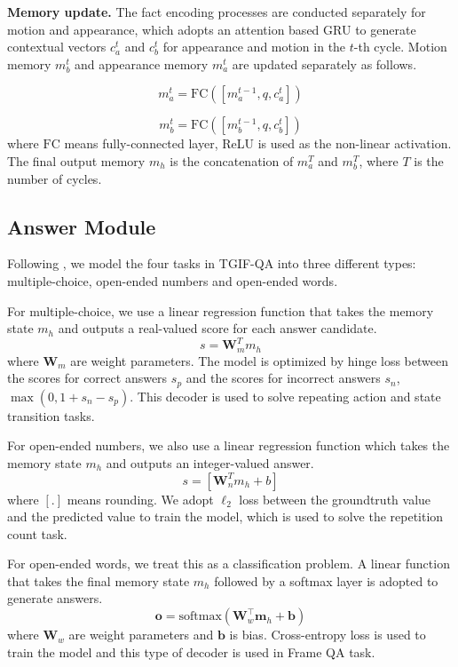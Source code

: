 \documentclass[10pt,twocolumn,letterpaper]{article}
\begin{document}
\textbf{Memory update.} The fact encoding processes are conducted separately for motion and appearance, which adopts an attention based GRU \cite{xiong2016dynamic} to generate contextual vectors $c_a^t$ and $c_b^t$ for appearance and motion in the $t$-th cycle. Motion memory $m_b^t$ and appearance memory $m_a^t$ are updated separately as follows.

\begin{equation}
    m_a^t=\mbox{FC}([m_a^{t-1},q,c_a^t])
\end{equation}

\begin{equation}
    m_b^t=\mbox{FC}([m_b^{t-1},q,c_b^t])
\end{equation}
where $\mbox{FC}$ means fully-connected layer, ReLU is used as the non-linear activation. The final output memory $m_h$ is the concatenation of $m_a^T$ and $m_b^T$, where $T$ is the number of cycles.


\subsection{Answer Module}
Following \cite{Jang_2017_CVPR}, we model the four tasks in TGIF-QA \cite{Jang_2017_CVPR} into three different types: multiple-choice, open-ended numbers and open-ended words. 

For multiple-choice, we use a linear regression function that takes the memory state $m_h$ and outputs a real-valued score for each answer candidate.
\begin{equation}
    s=\mathbf W_m^T m_h
\end{equation}
where $\mathbf W_m$ are weight parameters. The model is optimized by hinge loss between the scores for correct answers $s_p$ and the scores for incorrect answers $s_n$, $\max(0, 1 + s_{n} - s_{p})$. This decoder is used to solve repeating action and state transition tasks.

For open-ended numbers, we also use a linear regression function which takes the memory state $m_h$ and outputs an integer-valued answer.
\begin{equation}
    s=[\mathbf W_n^T m_h+b]
\end{equation}
where $[.]$ means rounding. We adopt $\ell_2$ loss between the groundtruth value and the predicted value to train the model, which is used to solve the repetition count task.

For open-ended words, we treat this as a classification problem. A linear function that takes the final memory state $m_h$ followed by a softmax layer is adopted to generate answers.
\begin{equation}
\label{eq:decoder_oe}
  \mathbf o = \mbox{softmax} \left ( \mathbf  W_w^{\top} \mathbf m_h + \mathbf b \right )
\end{equation}
where $\mathbf W_w$ are weight parameters and $\mathbf b$ is bias. Cross-entropy loss is used to train the model and this type of decoder is used in Frame QA task.
\end{document}
